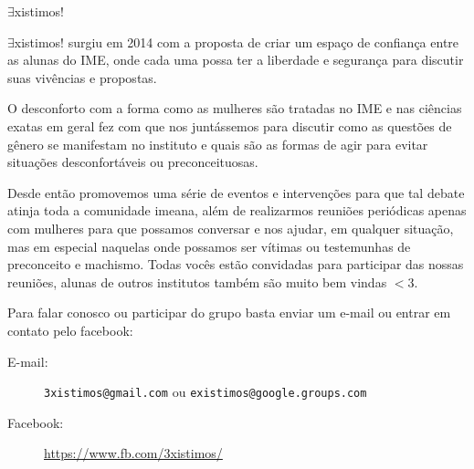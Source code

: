 \begin{subsecao}{\texorpdfstring{$\exists$}{E}xistimos!}



$\exists$xistimos! surgiu em 2014 com a proposta de criar um espaço de
confiança entre as alunas do IME, onde cada uma possa ter a liberdade e
segurança para discutir suas vivências e propostas.

O desconforto com a forma como as mulheres são tratadas no IME e nas ciências
exatas em geral fez com que nos juntássemos para discutir como as questões de
gênero se manifestam no instituto e quais são as formas de agir para evitar
situações desconfortáveis ou preconceituosas.

Desde então promovemos uma série de eventos e intervenções para que tal debate
atinja toda a comunidade imeana, além de realizarmos reuniões periódicas apenas
com mulheres para que possamos conversar e nos ajudar, em qualquer situação,
mas em especial naquelas onde possamos ser vítimas ou testemunhas de  
preconceito e machismo. Todas vocês estão convidadas para participar das nossas  
reuniões, alunas de outros institutos também são muito bem vindas $<$3.

Para falar conosco ou participar do grupo basta enviar um e-mail ou entrar em
contato pelo facebook:


\begin{description}

\item[E-mail:] {\tt 3xistimos@gmail.com} ou {\tt existimos@google.groups.com}
\item[Facebook:] \url{https://www.fb.com/3xistimos/}

\end{description}


\end{subsecao}

